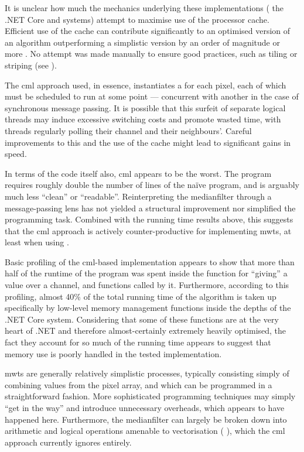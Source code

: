 It is unclear how much the mechanics underlying these implementations (\ie{} the .NET Core and \hopac{} systems) attempt to maximise use of the processor cache.  Efficient use of the cache can contribute significantly to an optimised version of an algorithm outperforming a simplistic version by an order of magnitude or more \cite{Ragan-Kelley2017}.  No attempt was made manually to ensure good practices, such as tiling or striping (see \eg{} \cite{Midkiff2012}).

The \gls{cml} approach used, in essence, instantiates a  for each pixel, each of which must be scheduled to run at some point --- concurrent with another  in the case of synchronous message passing.  It is possible that this surfeit of separate logical threads may induce excessive switching costs and promote wasted time, with threads regularly polling their channel and their neighbours'.  Careful improvements to this and the use of the cache might lead to significant gains in speed.

In terms of the code itself also, \gls{cml} appears to be the worst.  The program requires roughly double the number of lines of the naïve program, and is arguably much less ``clean'' or ``readable''.  Reinterpreting the \gls{medianfilter} through a message-passing lens has not yielded a structural improvement nor simplified the programming task.  Combined with the running time results above, this suggests that the \gls{cml} approach is actively counter-productive for implementing \glspl{mwt}, at least when using \hopac{}.

Basic profiling of the \gls{cml}-based implementation appears to show that more than half of the runtime of the program was spent inside the function for ``giving'' a value over a channel, and functions called by it.  Furthermore, according to this profiling, almost 40\% of the total running time of the algorithm is taken up specifically by low-level memory management functions inside the depths of the .NET Core system.  Considering that some of these functions are at the very heart of .NET and therefore almost-certainly extremely heavily optimised, the fact they account for so much of the running time appears to suggest that memory use is poorly handled in the tested implementation.

\Glspl{mwt} are generally relatively simplistic processes, typically consisting simply of combining values from the pixel array, and which can be programmed in a straightforward fashion.  More sophisticated programming techniques may simply ``get in the way'' and introduce unnecessary overheads, which appears to have happened here.  Furthermore, the \gls{medianfilter} can largely be broken down into arithmetic and logical operations amenable to vectorisation (\eg{} \cite{Sanchez2012,Perreault2007}), which the \gls{cml} approach currently ignores entirely.


